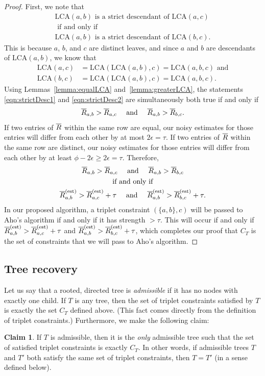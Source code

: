 \documentclass{article}
\theoremstyle{definition}
\newtheorem{claim}[thm]{Claim}
\newcommand{\LCA}{\text{LCA}}
\newcommand{\RbarEst}{\Rbar^\text{(est)}}
\begin{document}
\begin{proof}
First, we note that
\begin{gather}
\LCA(a,b) \text{ is a strict descendant of } \LCA(a,c) \label{eqn:strictDesc1} \\
\text{ if and only if } \nonumber \\
\LCA(a,b) \text{ is a strict descendant of } \LCA(b,c). \label{eqn:strictDesc2}
\end{gather}
This is because $a$, $b$, and $c$ are distinct leaves, and since $a$ and $b$ are descendants of $\LCA(a,b)$, we know that
\begin{align*}
\LCA(a,c) &= \LCA(\LCA(a,b),c) = \LCA(a,b,c) \text{ and} \\
\LCA(b,c) &= \LCA(\LCA(a,b),c) = \LCA(a,b,c).
\end{align*}
Using Lemmas~\ref{lemma:equalLCA} and~\ref{lemma:greaterLCA}, the statements \eqref{eqn:strictDesc1} and \eqref{eqn:strictDesc2} are simultaneously both true if and only if
\begin{gather*}
\overline{R}_{a,b} > \overline{R}_{a,c}
\quad \text{ and } \quad
\overline{R}_{a,b} > \overline{R}_{b,c}.
\end{gather*}
If two entries of $\overline{R}$ within the same row are equal, our noisy estimates for those entries will differ from each other by at most $2\epsilon = \tau$.
If two entries of $\overline{R}$ within the same row are distinct, our noisy estimates for those entries will differ from each other by at least $\phi - 2\epsilon \geq 2\epsilon = \tau$.
Therefore,
\begin{gather*}
\Rbar_{a,b} > \Rbar_{a,c}
\quad \text{ and } \quad
\Rbar_{a,b} > \Rbar_{b,c} \\
%
\text{ if and only if } \\
%
\RbarEst_{a,b} > \RbarEst_{a,c} + \tau
\quad \text{ and } \quad
\RbarEst_{a,b} > \RbarEst_{b,c} + \tau.
\end{gather*}
In our proposed algorithm, a triplet constraint $(\{a,b\},c)$ will be passed to Aho's algorithm if and only if it has strength $> \tau$.
This will occur if and only if $\RbarEst_{a,b} > \RbarEst_{a,c} + \tau$ and $\RbarEst_{a,b} > \RbarEst_{b,c} + \tau$, which completes our proof that $C_T$ is the set of constraints that we will pass to Aho's algorithm.
\end{proof}

\subsection{Tree recovery}
Let us say that a rooted, directed tree is \emph{admissible} if it has no nodes with exactly one child.
If $T$ is any tree, then the set of triplet constraints satisfied by $T$ is exactly the set $C_T$ defined above.
(This fact comes directly from the definition of triplet constraints.)
Furthermore, we make the following claim:
\begin{claim}
If $T$ is admissible, then it is the \emph{only} admissible tree such that the set of satisfied triplet constraints is exactly $C_T$.
In other words, if admissible trees $T$ and $T'$ both satisfy the same set of triplet constraints, then $T = T'$ (in a sense defined below).
\end{claim}
\end{document}
